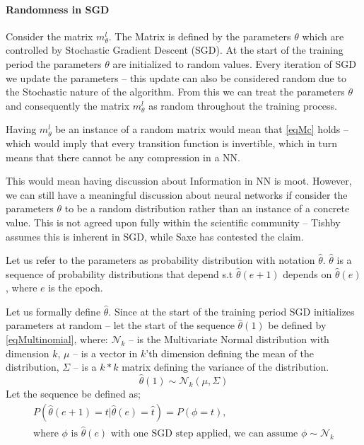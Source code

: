 \documentclass[dissertation.tex]{subfiles}
\begin{document}
\paragraph{Randomness in SGD} 
Consider the matrix $m_\theta^l$. The Matrix is defined by the parameters
$\theta$ which are controlled by Stochastic Gradient Descent (SGD). At the start
of the training period the parameters $\theta$ are initialized to random values.
Every iteration of SGD we update the parameters -- this update can also be
considered random due to the Stochastic nature of the algorithm. From this we
can treat the parameters $\theta$ and consequently the matrix $m_\theta^l$ as
random throughout the training process.

Having $m_\theta^l$ be an instance of a random matrix would mean that
\autoref{eqMc} holds -- which would imply that every transition function is
invertible, which in turn means that there cannot be any compression in a NN.

This would mean having discussion about Information in NN is moot. However, we
can still have a meaningful discussion about neural networks if consider the
parameters $\theta$ to be a random distribution rather than an instance of a
concrete value. This is not agreed upon fully within the scientific community --
Tishby assumes this is inherent in SGD, while Saxe has contested the claim.

Let us refer to the parameters as probability distribution with notation
$\hat\theta$. $\hat\theta$ is a sequence of probability distributions that
depend s.t $\hat\theta(e+1)$ depends on $\hat\theta(e)$, where $e$ is the epoch.

Let us formally define $\hat\theta$. Since at the start of the training period
SGD initializes parameters at random -- let the start of the sequence
$\hat\theta(1)$ be defined by \autoref{eqMultinomial}, where: $\mathcal{N}_k$ --
is the Multivariate Normal distribution with dimension $k$, $\mu$ -- is a vector
in $k$'th dimension defining the mean of the distribution, $\Sigma$ -- is a
$k*k$ matrix defining the variance of the distribution.
\begin{equation}
  \hat\theta(1)\sim\mathcal{N}_k(\mu,\Sigma)
  \label{eqMultinomial}
\end{equation}
Let the sequence be defined as;
\begin{gather}
  P(\hat\theta(e+1) = t | \hat\theta(e) = \hat{t}) = P(\phi = t), \\
  \text{where }\phi
  \text{ is }\hat\theta(e)
  \text{ with one SGD step applied, we can assume }
  \phi\sim\mathcal{N}_k
  \label{eqSequence}
\end{gather}
\end{document}
